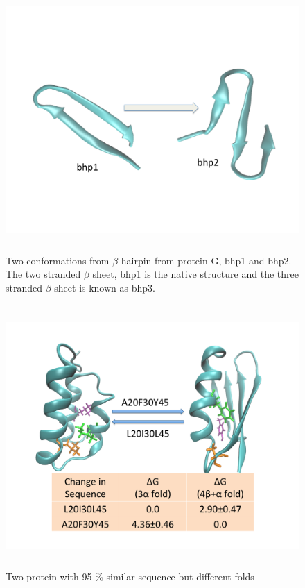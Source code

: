 \documentclass[12pt]{article}
\begin{document}
\begin{figure}
\begin{center}
\includegraphics[width=12cm,height=10cm]{bhp.pdf}
\end{center}
\caption{Two conformations from $\beta$ hairpin from protein G, bhp1 and bhp2. The two stranded $\beta$ sheet, bhp1 is the native structure and the three stranded $\beta$ sheet is known as bhp3.}
\label{fig:bhp_conf}
\end{figure}

\begin{figure}
\begin{center}
\includegraphics[width=12cm,height=10cm]{G95.pdf}
\end{center}
\caption{Two protein with 95 \% similar sequence but different folds}
\label{fig:G95}
\end{figure}
\end{document}
